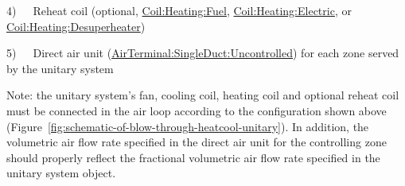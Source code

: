 4)~~~Reheat coil (optional, \hyperref[coilheatinggas-000]{Coil:Heating:Fuel}, \hyperref[coilheatingelectric]{Coil:Heating:Electric}, or \hyperref[coilheatingdesuperheater]{Coil:Heating:Desuperheater})

5)~~~Direct air unit (\hyperref[airterminalsingleductuncontrolled]{AirTerminal:SingleDuct:Uncontrolled}) for each zone served by the unitary system

Note: the unitary system's fan, cooling coil, heating coil and optional reheat coil must be connected in the air loop according to the configuration shown above (Figure~\ref{fig:schematic-of-blow-through-heatcool-unitary}). In addition, the volumetric air flow rate specified in the direct air unit for the controlling zone should properly reflect the fractional volumetric air flow rate specified in the unitary system object.

